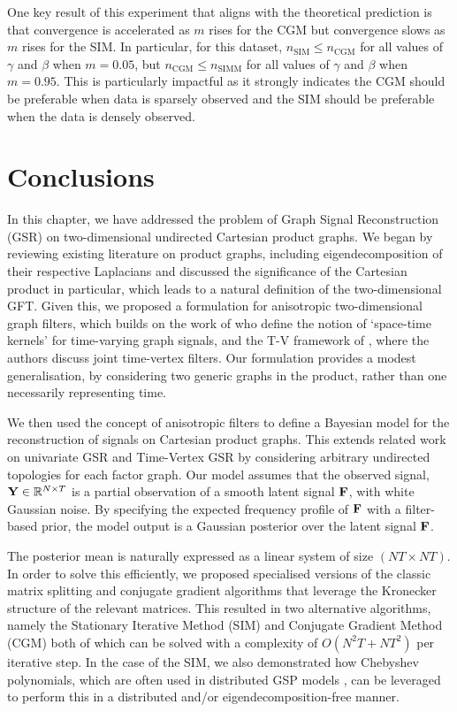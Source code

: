 One key result of this experiment that aligns with the theoretical prediction is that convergence is accelerated as $m$ rises for the CGM but convergence slows as $m$ rises for the SIM. In particular, for this dataset, $n_\text{SIM} \leq n_\text{CGM}$ for all values of $\gamma$ and $\beta$ when $m=0.05$, but $n_\text{CGM} \leq n_\text{SIMM}$ for all values of $\gamma$ and $\beta$ when $m=0.95$. This is particularly impactful as it strongly indicates the CGM should be preferable when data is sparsely observed and the SIM should be preferable when the data is densely observed. 


\section{Conclusions}

In this chapter, we have addressed the problem of Graph Signal Reconstruction (GSR) on two-dimensional undirected Cartesian product graphs. We began by reviewing existing literature on product graphs, including eigendecomposition of their respective Laplacians \citep{Imrich2000} and discussed the significance of the Cartesian product in particular, which leads to a natural definition of the two-dimensional GFT. Given this, we proposed a formulation for anisotropic two-dimensional graph filters, which builds on the work of \cite{Ioannidis2016} who define the notion of `space-time kernels' for time-varying graph signals, and the T-V framework of \cite{Grassi2018, Isufi2017, Loukas2016}, where the authors discuss joint time-vertex filters. Our formulation provides a modest generalisation, by considering two generic graphs in the product, rather than one necessarily representing time. 

We then used the concept of anisotropic filters to define a Bayesian model for the reconstruction of signals on Cartesian product graphs. This extends related work on univariate GSR \citep{Narang2013,Romero2017b} and Time-Vertex GSR \citep{Qiu2017,Ioannidis2016} by considering arbitrary undirected topologies for each factor graph. Our model assumes that the observed signal, $\mathbf{Y} \in \mathbb{R}^{N \times T}$ is a partial observation of a smooth latent signal $\mathbf{F}$, with white Gaussian noise. By specifying the expected frequency profile of $\mathbf{F}$ with a filter-based prior, the model output is a Gaussian posterior over the latent signal $\mathbf{F}$. 

The posterior mean is naturally expressed as a linear system of size $(NT \times NT)$. In order to solve this efficiently, we proposed specialised versions of the classic matrix splitting and conjugate gradient algorithms that leverage the Kronecker structure of the relevant matrices. This resulted in two alternative algorithms, namely the Stationary Iterative Method (SIM) and Conjugate Gradient Method (CGM) both of which can be solved with a complexity of $O(N^2T + NT^2)$ per iterative step. In the case of the SIM, we also demonstrated how Chebyshev polynomials, which are often used in distributed GSP models \citep{Shuman2018}, can be leveraged to perform this in a distributed and/or eigendecomposition-free manner. 

